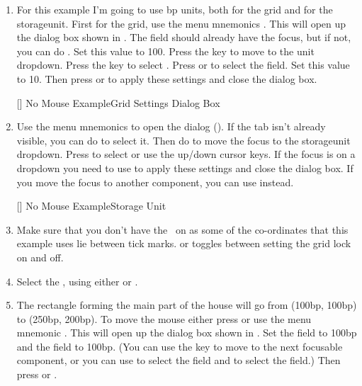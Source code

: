 \begin{enumerate}
\item For this example I'm going to use \gls{bp} units, both for the
grid and for the \gls{storageunit}. First for the grid, use the menu mnemonics
. This will open up the
 dialog box shown in
.  The 
field should already have the focus, but if not, you can do
. Set this value to 100. Press the
 key to move to the unit \gls{dropdown}. Press the
 key to select . Press  or
 to select the
 field. Set this value to 10.
Then press  or  to
apply these settings and close the  dialog box.

[]
{}
{No Mouse Example\dash Grid Settings Dialog Box}

\item Use the menu mnemonics  to open
the  dialog
(). If the
 tab isn't already visible, you can
do  to select it. Then do
 to move the focus to the
\gls*{storageunit} \gls{dropdown}. Press  to select
 or use the up/down cursor keys. If the focus is on
a \gls*{dropdown} you need to use  to apply these
settings and close the dialog box. If you move the focus to another
component, you can use  instead.

[]
{}
{No Mouse Example\dash Storage Unit}

\item Make sure that you don't have the \gridlock\ on as some of the
co-ordinates that this example uses lie between tick marks.
 or
toggles between setting the grid lock on and off.

\item Select the ,
using either  or 
.

\item The rectangle forming the main part of the house will go from
(100bp, 100bp) to (250bp, 200bp). To move the mouse either press
 or use the menu mnemonic 
.
This will open up the  dialog box shown in
. Set the  field
to 100bp and the  field to 100bp.  (You can
use the  key to move to the next focusable component, or you
can use  to select the  field
and  to select the  field.)
Then press  or .


\end{enumerate}

